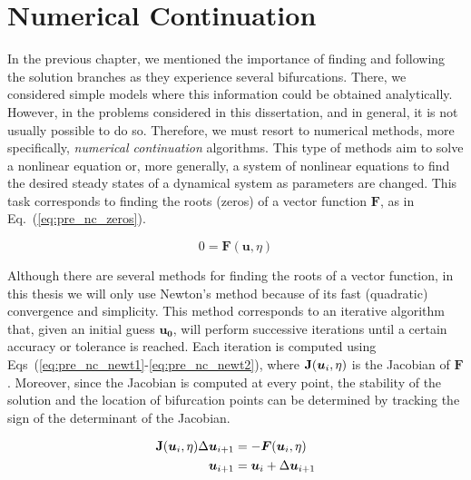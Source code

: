 \chapter{Numerical Continuation}

\label{ch:continuation}

In the previous chapter, we mentioned the importance of finding and following
the solution branches as they experience several bifurcations. There, we considered simple
models where this information could be obtained analytically. However, in the problems considered
in this dissertation, and in general, it is not usually possible to do so. Therefore,
we must resort to numerical methods, more specifically, 
{\em numerical continuation} algorithms. This type of methods
aim to solve a nonlinear equation or, more generally, a system of nonlinear 
equations to find the desired steady states of a dynamical system 
as parameters are changed. This task corresponds to finding the roots 
(zeros) of a vector function $\bm{F}$, as in Eq.~(\ref{eq:pre_nc_zeros}). 


\begin{equation}
    0 = \bm{F}(\bm{u}, \eta)
    \label{eq:pre_nc_zeros}
\end{equation}

Although there are several methods for finding the roots of a vector function,
in this thesis we will only use Newton's method because of its fast 
(quadratic) convergence and simplicity. This method corresponds to an 
iterative algorithm that, given an initial guess $\bm{u_0}$, will perform 
successive iterations until a certain accuracy or tolerance is reached. 
Each iteration is computed using Eqs~(\ref{eq:pre_nc_newt1}-\ref{eq:pre_nc_newt2}),
where $\mathbf{J}(\bm{u}_i, \eta)$ is the Jacobian of $\bm{F}$. 
Moreover, since the Jacobian is computed at every point, the stability 
of the solution and the location of bifurcation points can be determined
by tracking the sign of the determinant of the Jacobian.

\begin{align}
    \mathbf{J}(\bm{u}_i, \eta) \Delta \bm{u}_{i+1} &= - \bm{F}(\bm{u}_i, \eta) 
    \label{eq:pre_nc_newt1}
    \\
    \bm{u}_{i+1} &= \bm{u}_i + \Delta \bm{u}_{i+1}
    \label{eq:pre_nc_newt2}
\end{align}

